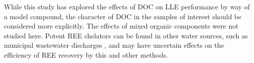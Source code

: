 While this study has explored the effects of DOC on LLE performance by way of a model compound, the character of DOC in the samples of interest should be considered more explicitly.
The effects of mixed organic components were not studied here.
Potent REE chelators can be found in other water sources, such as municipal wastewater discharges \citep{Bau_EPSL_1996,Kulaksiz_EPSL_2013}, and may have uncertain effects on the efficiency of REE recovery by this and other methods.


